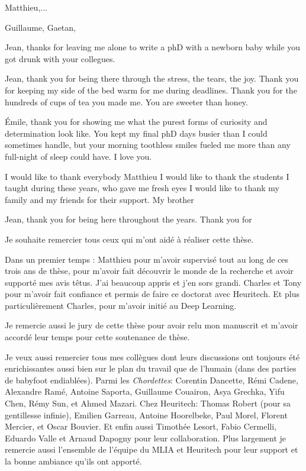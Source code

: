 Matthieu,...

Guillaume, 
Gaetan, 

Jean, thanks for leaving me alone to write a phD with a newborn baby 
while you got drunk with your collegues. 

Jean, thank you for being there through the stress, the tears, the joy. 
Thank you for keeping my side of the bed warm for me during deadlines.
Thank you for the hundreds of cups of tea you made me. You are sweeter
than honey.

Émile, thank you for showing me what the purest forms of curiosity and 
determination look like. You kept my final phD days busier than I could 
sometimes handle, but your morning toothless smiles fueled me more than 
any full-night of sleep could have. I love you.


I would like to thank everybody 
Matthieu 
I would like to thank the students I taught during these years, who gave me fresh eyes
I would like to thank my family and my friends for their support. My brother

Jean, thank you for being here throughout the years. Thank you for 



Je souhaite remercier tous ceux qui m'ont aidé à réaliser cette thèse.

Dans un premier temps : Matthieu pour m'avoir supervisé tout au long de ces trois ans de thèse,
pour m'avoir fait découvrir le monde de la recherche et avoir supporté mes avis têtus. J'ai beaucoup
appris et j'en sors grandi. Charles et Tony pour m'avoir fait confiance et permis de faire ce
doctorat avec Heuritech. Et plus particulièrement Charles, pour m'avoir initié au Deep Learning.

Je remercie aussi le jury de cette thèse pour avoir relu mon manuscrit et m'avoir accordé leur temps
pour cette soutenance de thèse.

Je veux aussi remercier tous mes collègues dont leurs discussions ont toujours été enrichissantes
aussi bien sur le plan du travail que de l'humain (dans des parties de babyfoot endiablées). Parmi
les \textit{Chordettes}: Corentin Dancette, Rémi Cadene, Alexandre Ramé, Antoine Saporta, Guillaume
Couairon, Asya Grechka, Yifu Chen, Rémy Sun, et Ahmed Mazari. Chez Heuritech: Thomas Robert (pour sa
gentillesse infinie), Emilien Garreau, Antoine Hoorelbeke, Paul Morel, Florent Mercier, et Oscar
Bouvier. Et enfin aussi Timothée Lesort, Fabio Cermelli, Eduardo Valle et Arnaud Dapogny pour leur
collaboration. Plus largement je remercie aussi l'ensemble de l'équipe du MLIA et Heuritech pour
leur support et la bonne ambiance qu'ils ont apporté.

